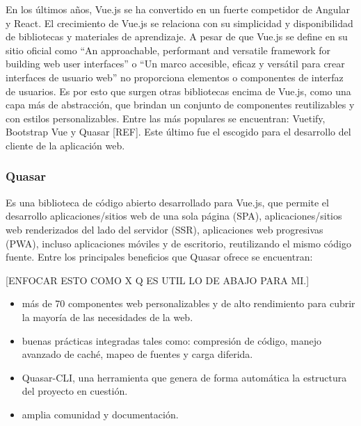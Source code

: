 En los últimos años, Vue.js se ha convertido
en un fuerte competidor de Angular y React. El 
crecimiento de Vue.js se relaciona con su simplicidad 
y disponibilidad de bibliotecas y materiales de aprendizaje. A pesar de que Vue.js se define en su sitio oficial como ``An approachable, performant and versatile framework for building web user interfaces''
o ``Un marco accesible, eficaz y versátil para crear interfaces de usuario web''
no proporciona elementos o componentes de interfaz de usuarios. Es por esto que surgen  
otras bibliotecas encima de Vue.js, como una capa más de abstracción, que 
brindan un conjunto de componentes reutilizables y con estilos personalizables. Entre 
las más populares se encuentran: Vuetify, Bootstrap Vue y Quasar [REF].
Este último fue el escogido para el desarrollo del cliente de la aplicación web. 
  



\subsubsection{Quasar}
Es una biblioteca de código abierto desarrollado para Vue.js,
que permite el desarrollo aplicaciones/sitios web de una sola página (SPA),
aplicaciones/sitios web renderizados del lado del servidor (SSR),
aplicaciones web progresivas (PWA), incluso aplicaciones móviles y de 
escritorio, reutilizando el mismo código fuente. 
Entre los principales beneficios que Quasar ofrece 
se encuentran:

[ENFOCAR ESTO COMO X Q ES UTIL LO DE ABAJO PARA MI.]

\begin{itemize}
    \item más de 70 componentes web personalizables y de alto rendimiento para cubrir la 
    mayoría de las necesidades de la web.
    \item buenas prácticas integradas tales como: compresión de código, 
    manejo avanzado de caché, mapeo de fuentes y carga diferida. 
    \item Quasar-CLI, una herramienta que genera de forma automática la estructura del 
    proyecto en cuestión.
    \item amplia comunidad y documentación.

\end{itemize}



